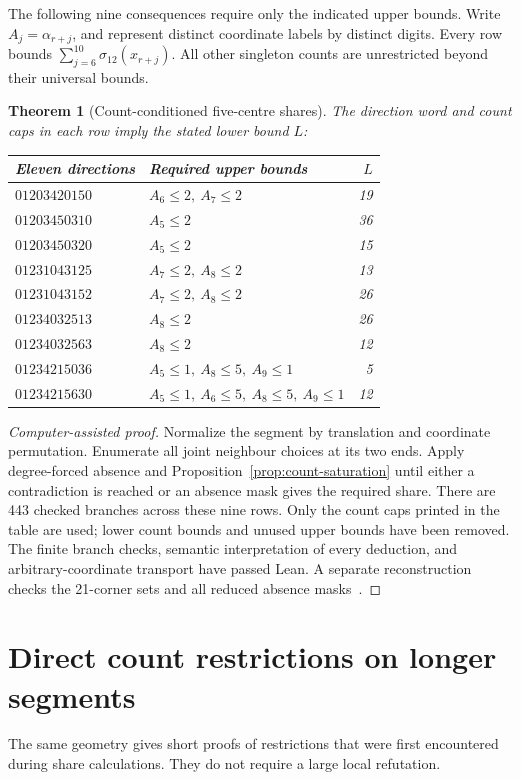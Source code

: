 \documentclass[11pt,a4paper]{article}
\newtheorem{theorem}{Theorem}[section]
\theoremstyle{definition}
\theoremstyle{remark}
\begin{document}
The following nine consequences require only the indicated upper bounds. Write $A_j=\alpha_{r+j}$, and represent distinct coordinate labels by distinct digits. Every row bounds $\sum_{j=6}^{10}\sigma_{12}(x_{r+j})$. All other singleton counts are unrestricted beyond their universal bounds.
\begin{theorem}[Count-conditioned five-centre shares]\label{thm:saturated-shares}
The direction word and count caps in each row imply the stated lower bound $L$:
\begin{center}\small
\begin{tabular}{l l r}
\toprule
Eleven directions & Required upper bounds & $L$\\\midrule
$01203420150$ & $A_{6}\le2,\ A_{7}\le2$ & 19\\
$01203450310$ & $A_{5}\le2$ & 36\\
$01203450320$ & $A_{5}\le2$ & 15\\
$01231043125$ & $A_{7}\le2,\ A_{8}\le2$ & 13\\
$01231043152$ & $A_{7}\le2,\ A_{8}\le2$ & 26\\
$01234032513$ & $A_{8}\le2$ & 26\\
$01234032563$ & $A_{8}\le2$ & 12\\
$01234215036$ & $A_{5}\le1,\ A_{8}\le5,\ A_{9}\le1$ & 5\\
$01234215630$ & $A_{5}\le1,\ A_{6}\le5,\ A_{8}\le5,\ A_{9}\le1$ & 12\\
\bottomrule
\end{tabular}
\end{center}
\end{theorem}
\begin{proof}[Computer-assisted proof]
Normalize the segment by translation and coordinate permutation. Enumerate all joint neighbour choices at its two ends. Apply degree-forced absence and Proposition~\ref{prop:count-saturation} until either a contradiction is reached or an absence mask gives the required share. There are 443 checked branches across these nine rows. Only the count caps printed in the table are used; lower count bounds and unused upper bounds have been removed. The finite branch checks, semantic interpretation of every deduction, and arbitrary-coordinate transport have passed Lean. A separate reconstruction checks the 21-corner sets and all reduced absence masks~\cite{choicearchive}.
\end{proof}

\section{Direct count restrictions on longer segments}\label{sec:long-counts}
The same geometry gives short proofs of restrictions that were first encountered during share calculations. They do not require a large local refutation.
\end{document}
